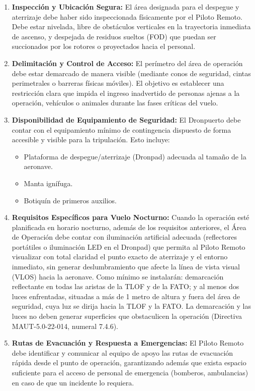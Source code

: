\begin{enumerate}
    \item \textbf{Inspección y Ubicación Segura:} 
    El área designada para el despegue y aterrizaje debe haber sido inspeccionada físicamente por el Piloto Remoto. Debe estar nivelada, libre de obstáculos verticales en la trayectoria inmediata de ascenso, y despejada de residuos sueltos (FOD) que puedan ser succionados por los rotores o proyectados hacia el personal.

    \item \textbf{Delimitación y Control de Acceso:}
    El perímetro del área de operación debe estar demarcado de manera visible (mediante conos de seguridad, cintas perimetrales o barreras físicas móviles). El objetivo es establecer una restricción clara que impida el ingreso inadvertido de personas ajenas a la operación, vehículos o animales durante las fases críticas del vuelo.

    \item \textbf{Disponibilidad de Equipamiento de Seguridad:}
    El Dronpuerto debe contar con el equipamiento mínimo de contingencia dispuesto de forma accesible y visible para la tripulación. Esto incluye:
    \begin{itemize}
        \item Plataforma de despegue/aterrizaje (Dronpad) adecuada al tamaño de la aeronave.
        \item Manta ignífuga.
        \item Botiquín de primeros auxilios.
    \end{itemize}

    \item \textbf{Requisitos Específicos para Vuelo Nocturno:}
    Cuando la operación esté planificada en horario nocturno, además de los requisitos anteriores, el Área de Operación debe contar con iluminación artificial adecuada (reflectores portátiles o iluminación LED en el Dronpad) que permita al Piloto Remoto visualizar con total claridad el punto exacto de aterrizaje y el entorno inmediato, sin generar deslumbramiento que afecte la línea de vista visual (VLOS) hacia la aeronave. Como mínimo se instalarán: demarcación reflectante en todas las aristas de la TLOF y de la FATO; y al menos dos luces enfrentadas, situadas a más de 1 metro de altura y fuera del área de seguridad, cuya luz se dirija hacia la TLOF y la FATO. La demarcación y las luces no deben generar superficies que obstaculicen la operación (Directiva MAUT-5.0-22-014, numeral 7.4.6).

    \item \textbf{Rutas de Evacuación y Respuesta a Emergencias:}
    El Piloto Remoto debe identificar y comunicar al equipo de apoyo las rutas de evacuación rápida desde el punto de operación, garantizando además que exista espacio suficiente para el acceso de personal de emergencia (bomberos, ambulancias) en caso de que un incidente lo requiera.
\end{enumerate}

